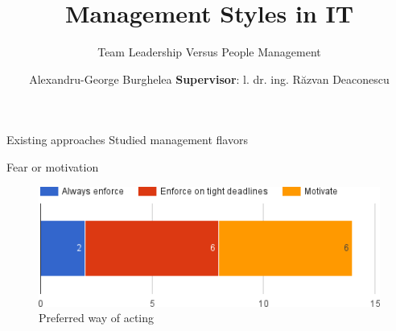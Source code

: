 \documentclass{beamer}
\title{Management Styles in IT}
\subtitle{Team Leadership Versus People Management}
\author{Alexandru-George Burghelea \newline
  \textbf{Supervisor}: \cb{S}l. dr. ing. R\u{a}zvan Deaconescu}
\begin{document}
\frame{\titlepage}

\begin{frame}{Existing approaches}
Studied management flavors
\begin{description}
  
\end{description}
\end{frame}

\begin{frame}{Fear or motivation}
\begin{figure}[h]
  \centering
  \includegraphics[scale=0.5]{wayofacting.png}
  \caption{Preferred way of acting}
  \label{fig:axbgrid}
\end{figure}

\end{frame}
\end{document}

